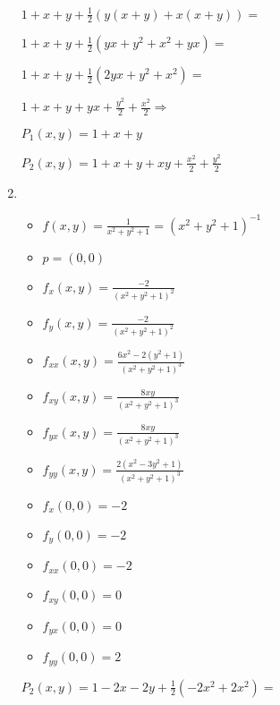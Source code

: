 \documentclass[../practica_05.tex]{subfiles}
\begin{document}
\begin{enumerate}
            $ 1 + x + y + \frac{1}{2}(y(x+y) + x(x+y)) = $

            $ 1 + x + y + \frac{1}{2}(yx+ y^2 + x^2 + yx) = $

            $ 1 + x + y + \frac{1}{2}(2yx + y^2 + x^2) = $

            $ 1 + x + y + yx + \frac{y^2}{2} + \frac{x^2}{2} \Rightarrow $

            $ P_1(x,y) = 1 + x + y $

            $ P_2(x,y) = 1 + x + y + xy + \frac{x^2}{2} + \frac{y^2}{2} $

        \item 
            \begin{itemize}
                \item $f(x,y) = \frac{1}{x^2+y^2+1} = (x^2+y^2+1)^{-1} $
                \item $p = (0,0)$
            \end{itemize}

            \begin{itemize}
                \item $f_{x}(x,y) = \frac{-2}{(x^2+y^2+1)^2} $
                \item $f_{y}(x,y) = \frac{-2}{(x^2+y^2+1)^2} $
                \item $f_{xx}(x,y) = \frac{6x^2-2(y^2+1)}{(x^2+y^2+1)^3} $
                \item $f_{xy}(x,y) = \frac{8xy}{(x^2+y^2+1)^3} $
                \item $f_{yx}(x,y) = \frac{8xy}{(x^2+y^2+1)^3} $
                \item $f_{yy}(x,y) = \frac{2(x^2-3y^2+1)}{(x^2+y^2+1)^3} $
            \end{itemize}

            \begin{itemize}
                \item $f_{x}(0,0) = -2 $
                \item $f_{y}(0,0) = -2 $
                \item $f_{xx}(0,0) = -2 $
                \item $f_{xy}(0,0) = 0 $
                \item $f_{yx}(0,0) = 0 $
                \item $f_{yy}(0,0) = 2 $
            \end{itemize}

            $P_2(x,y) = 1 - 2x - 2y + \frac{1}{2} (-2x^2 + 2x^2) = $


\end{enumerate}
\end{document}
